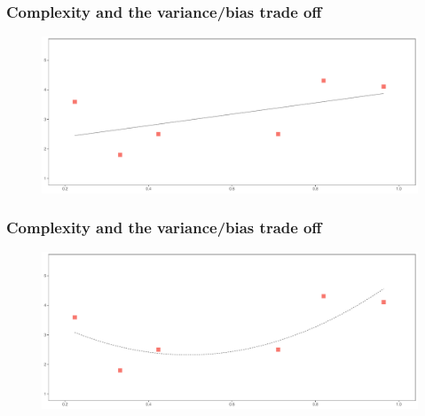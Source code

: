 \documentclass[
  shownotes,
  xcolor={svgnames},
  hyperref={colorlinks,citecolor=DarkBlue,linkcolor=DarkRed,urlcolor=DarkBlue}
  , aspectratio=169]{beamer}
\begin{document}
\begin{frame}
\frametitle{Complexity and the variance/bias trade off}


        \begin{figure}[H] \centering
            \captionsetup{justification=centering}
              \includegraphics[scale=0.4]{figures/fig_1b.pdf}
 \end{figure}

\end{frame}
\begin{frame}
\frametitle{Complexity and the variance/bias trade off}


        \begin{figure}[H] \centering
            \captionsetup{justification=centering}
              \includegraphics[scale=0.4]{figures/fig_1c.pdf}
 \end{figure}

\end{frame}
\end{document}

